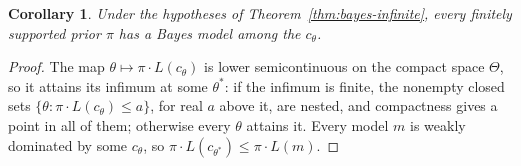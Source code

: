\documentclass[11pt]{article}
\newtheorem{corollary}[theorem]{Corollary}
\theoremstyle{definition}
\theoremstyle{remark}
\begin{document}
\begin{corollary}\label{cor:bayes-exist}
Under the hypotheses of Theorem~\ref{thm:bayes-infinite}, every finitely supported prior $\pi$ has a Bayes model among the $c_\theta$.
\end{corollary}
\begin{proof}
The map $\theta\mapsto\pi\cdot L(c_\theta)$ is lower semicontinuous on the compact space $\Theta$, so it attains its infimum at some $\theta^*$: if the infimum is finite, the nonempty closed sets $\{\theta:\pi\cdot L(c_\theta)\le a\}$, for real $a$ above it, are nested, and compactness gives a point in all of them; otherwise every $\theta$ attains it. Every model $m$ is weakly dominated by some $c_\theta$, so $\pi\cdot L(c_{\theta^*})\le\pi\cdot L(m)$.
\end{proof}
\end{document}
